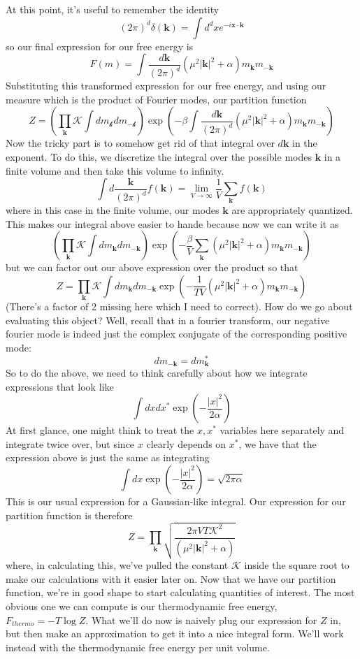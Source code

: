 At this point, it's useful to remember the identity \[ ( 2 \pi )^d \delta (\mathbf{k} ) = \int d^d x e^{- i \mathbf{x} \cdot \mathbf{k}} \] so our final expression for our free energy is \[ F(m ) = \int \frac{ d \mathbf{k} }{ (2 \pi ) ^d } \left( \mu^ 2 |\mathbf{k} |^2 + \alpha \right) m_\mathbf{k} m_{ - \mathbf{k} } \]   
Substituting this transformed expression for our free energy, and using our measure which is the product of Fourier modes, our partition function \[ Z = \left( \prod_\mathbf{k} \mathcal{K} \int dm_\mathcal{k } dm_{ - \mathcal{k} } \right) \exp \left(  - \beta \int \frac{ d\mathbf{k} } { (2 \pi )^d } \left( \mu^2 |\mathbf{k}|^2 + \alpha \right) m_\mathbf{k} m_{ - \mathbf{k}} \right) \]
Now the tricky part is to somehow get rid of that integral over $d \mathbf{k}$ in the exponent. To do this, we discretize the integral over the possible modes $\mathbf{k} $ in a finite volume and then take this volume to infinity. \[ \int d \frac{ \mathbf{k} }{ (2 \pi)^d } f( \mathbf{k} ) = \lim_{V \rightarrow \infty} \frac{ 1 }{ V} \sum_\mathbf{k} f(\mathbf{k} ) \] where in this case in the finite volume, our modes $\mathbf{k} $ are appropriately quantized. This makes our integral above easier to hande because now we can write it as \[ \left( \prod_\mathbf{k} \mathcal { K } \int dm_\mathbf{k} dm_{  - \mathbf{k} } \right) \exp \left( - \frac{ \beta}{ V } \sum_{ \mathbf{ k } } ( \mu^2 |\mathbf{ k} |^2 + \alpha )m_\mathbf{k} m_{ - \mathbf{k} } \right) \] but we can factor out our above expression over the product so that \[ Z = \prod_{ \mathbf{k} } \mathcal {K} \int dm_\mathbf{k} dm_\mathbf{-k} \exp \left(  - \frac{1}{ TV}  ( \mu^2 |\mathbf{k}|^2 + \alpha ) m_\mathbf{k} m_\mathbf{ -k } \right) \] 
(There's a factor of 2 missing here which I need to correct). How do we go about evaluating this object? Well, recall that in a fourier transform, our negative fourier mode is indeed just the complex conjugate of the corresponding positive mode: 
\[ 
dm_{  - \mathbf{k}}  = dm_\mathbf{ k}^* 
\] 
So to do the above, we need to think carefully about how we integrate expressions that look like 
\[ 
\int dx dx^* \exp \left(  - \frac{ |x|^2 }{ 2 \alpha } \right)  
\] 
At first glance, one might think to treat the $x, x^* $ variables here separately and integrate twice over, but since $x$ clearly depends on $x^*$, we have that the expression above is just the same as integrating 
\[ 
\int dx \exp \left(  - \frac{ |x|^2 }{ 2 \alpha } \right) = \sqrt{ 2 \pi \alpha }  
\] 
This is our usual expression for a Gaussian-like integral. Our expression for our partition function is therefore 
\[ 
Z = \prod_{ \mathbf{k}} \sqrt{ \frac{ 2 \pi V T \mathcal{ K }^2 }{ ( \mu^2 |\mathbf{ k} |^2 + \alpha  ) } }  
\]   
where, in calculating this, we've pulled the constant $\mathcal{K}$ inside the square root to make our calculations with it easier later on. Now that we have our partition function, we're in good shape to start calculating quantities of interest. The most obvious one we can compute is our thermodynamic free energy, $F_{thermo} =  - T \log Z$. What we'll do now is naively plug our expression for $Z$ in, but then make an approximation to get it into a nice integral form. We'll work instead with the thermodynamic free energy per unit volume. 

